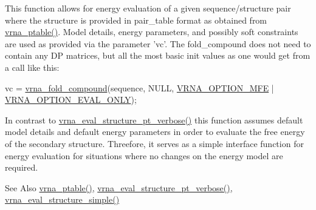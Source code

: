 This function allows for energy evaluation of a given sequence/structure pair where the structure is provided in pair\-\_\-table format as obtained from \hyperlink{group__struct__utils_gae829fb8bb7f694c12a9c0bbc34c77c60}{vrna\-\_\-ptable()}. Model details, energy parameters, and possibly soft constraints are used as provided via the parameter 'vc'. The fold\-\_\-compound does not need to contain any D\-P matrices, but all the most basic init values as one would get from a call like this\-: 
\begin{DoxyCode}
vc = \hyperlink{group__fold__compound_ga6601d994ba32b11511b36f68b08403be}{vrna\_fold\_compound}(sequence, NULL, \hyperlink{group__fold__compound_gae63be9127fe7dcc1f9bb14f5bb1064ee}{VRNA\_OPTION\_MFE} | 
      \hyperlink{group__fold__compound_ga61469c423131552c8483229f8b6c7e0e}{VRNA\_OPTION\_EVAL\_ONLY});
\end{DoxyCode}
 In contrast to \hyperlink{group__eval_ga8a517cfeeae8c376ae7b1e0c401d38b4}{vrna\-\_\-eval\-\_\-structure\-\_\-pt\-\_\-verbose()} this function assumes default model details and default energy parameters in order to evaluate the free energy of the secondary structure. Threefore, it serves as a simple interface function for energy evaluation for situations where no changes on the energy model are required.

\begin{DoxySeeAlso}{See Also}
\hyperlink{group__struct__utils_gae829fb8bb7f694c12a9c0bbc34c77c60}{vrna\-\_\-ptable()}, \hyperlink{group__eval_ga8a517cfeeae8c376ae7b1e0c401d38b4}{vrna\-\_\-eval\-\_\-structure\-\_\-pt\-\_\-verbose()}, \hyperlink{group__eval_gab6930f446d04761454d033680fbf7909}{vrna\-\_\-eval\-\_\-structure\-\_\-simple()}
\end{DoxySeeAlso}

